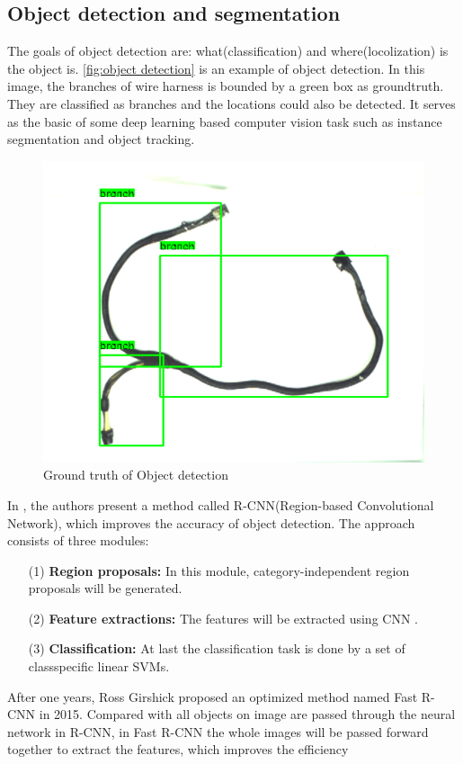\subsection{Object detection and segmentation}
    The goals of object detection are: what(classification) and where(locolization) is the object is. \autoref{fig:object detection} is an example of object
    detection. In this image, the branches of wire harness is bounded by a green box as groundtruth. They are classified as branches and the locations could 
    also be detected. It serves as the basic of some deep learning based computer vision task such as instance segmentation and object tracking\cite{10028728}. 
    \begin{figure}
        \centering
        \includegraphics[width=0.6\linewidth]{example_images/object detection}
        \caption{Ground truth of Object detection}
        \label{fig:object detection}
    \end{figure}
    In \cite{Girshick_2014_CVPR}, the authors present a method called R-CNN(Region-based Convolutional Network), which improves the accuracy of object detection. 
    The approach consists of three modules:
    \begin{itemize}
        \item [(1)] \textbf{Region proposals: }In this module, category-independent region proposals will be generated.
        \item [(2)] \textbf{Feature extractions: }The features will be extracted using CNN \cite{NIPS2012_c399862d}.
        \item [(3)] \textbf{Classification: }At last the classification task is done by a set of classspecific linear SVMs. 
    \end{itemize}
    After one years, Ross Girshick proposed an optimized method named Fast R-CNN in 2015\cite{Girshick_2015_ICCV}. Compared with all objects on image are passed 
    through the neural network in R-CNN,  in Fast R-CNN the whole images will be passed forward together to extract the features, which improves the efficiency 

